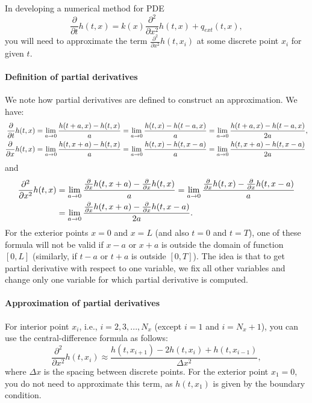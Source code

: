 \documentclass[11pt,a4paper]{article}
\newcommand{\p}{\partial }
\begin{document}
In developing a numerical method for PDE
\begin{equation}\label{eq:pdeHelp}
\frac{\p}{\p t} h(t, x) = k(x) \frac{\p^2 }{\p x^2} h(t, x) + q_{ext}(t, x),
\end{equation}
you will need to approximate the term  $\frac{\p^2 }{\p x^2} h(t, x_i)$ at some discrete point $x_i$ for given $t$. 

\paragraph{Definition of partial derivatives}
We note how partial derivatives are defined to construct an approximation. We have:
\begin{align}
\frac{\p}{\p t} h(t, x) &= \lim_{a \to 0} \frac{h(t + a, x) - h(t,x)}{a} = \lim_{a \to 0} \frac{h(t, x) - h(t-a,x)}{a} = \lim_{a \to 0} \frac{h(t + a, x) - h(t-a,x)}{2a}, \notag\\
\frac{\p}{\p x} h(t, x) &= \lim_{a \to 0} \frac{h(t , x+a) - h(t,x)}{a} = \lim_{a \to 0} \frac{h(t, x) - h(t, x - a)}{a} = \lim_{a \to 0} \frac{h(t, x+a) - h(t,x-a)}{2a}
\end{align}
and
\begin{align}
\frac{\p^2}{\p x^2} h(t, x) &= \lim_{a \to 0} \frac{\frac{\p}{\p x} h(t, x+a) - \frac{\p}{\p x} h(t, x)}{a} = \lim_{a \to 0} \frac{\frac{\p}{\p x} h(t, x) - \frac{\p}{\p x} h(t, x-a)}{a} \notag \\
&= \lim_{a \to 0} \frac{\frac{\p}{\p x} h(t, x+a) - \frac{\p}{\p x} h(t, x-a)}{2a}.
\end{align}
For the exterior points $x = 0$ and $x=L$ (and also $t=0$ and $t=T$), one of these formula will not be valid if $x-a$ or $x+a$ is outside the domain of function $[0,L]$ (similarly, if $t-a$ or $t+a$ is outside $[0,T]$). The idea is that to get partial derivative with respect to one variable, we fix all other variables and change only one variable for which partial derivative is computed.

\paragraph{Approximation of partial derivatives}
For interior point $x_i$, i.e., $i=2, 3, ..., N_x$ (except $i=1$ and $i=N_x + 1$), you can use the central-difference formula as follows:
\begin{equation}
\frac{\p^2 }{\p x^2} h(t, x_i) \approx \frac{h(t, x_{i+1}) - 2h(t, x_i) + h(t, x_{i-1})}{\Delta x^2},
\end{equation}
where $\Delta x$ is the spacing between discrete points. For the exterior point $x_1 = 0$, you do not need to approximate this term, as $h(t, x_1)$ is given by the boundary condition. 
\end{document}
